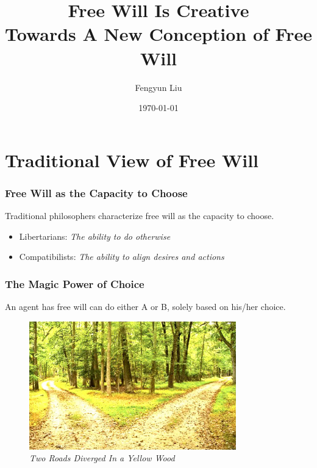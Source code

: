 \documentclass[xcolor=dvipsnames]{beamer}
\title[Free Will Is Creative]{Free Will Is Creative\\
  {\small Towards A New Conception of Free Will}
}
\author{Fengyun Liu}
\institute[EPFL]{EPFL}
\date{\today}
\theoremstyle{definition}
\begin{document}
{
\begin{frame}
    \titlepage{}
\end{frame}


}

\section{Traditional View of Free Will} %
\label{sec:Background}

\begin{frame}[fragile]
  \frametitle{Free Will as the Capacity to Choose}
  Traditional philosophers characterize free will as the \alert{capacity to choose}.

  \begin{itemize}
  \item Libertarians: \emph{The ability to do otherwise}
  \item Compatibilists: \emph{The ability to align desires and actions}
  \end{itemize}
\end{frame}

\begin{frame}[fragile]
  \frametitle{The Magic Power of Choice}
  An agent has free will can do either A or B, solely based on his/her choice.

  \begin{figure}
    \centering
    \includegraphics[width=0.8\textwidth]{images/woods.jpg}\\
    \emph{Two Roads Diverged In a Yellow Wood}
  \end{figure}
\end{frame}
\end{document}
